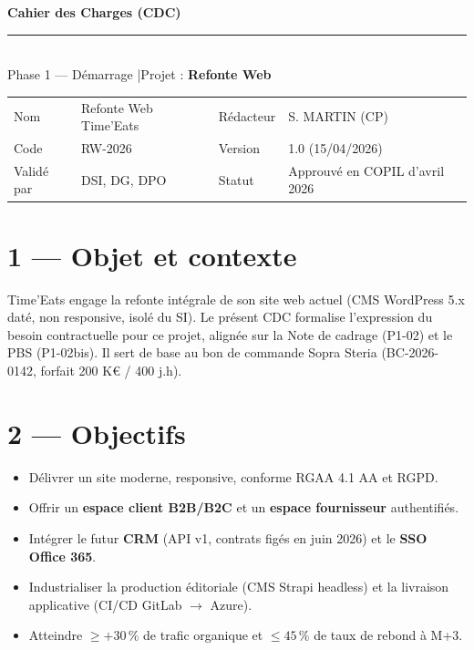 \documentclass[11pt,a4paper,oneside]{report}
\begin{document}
\small

\begin{center}
{\LARGE\bfseries\color{cnNavy} Cahier des Charges (CDC)}\\[4pt]
\textcolor{cnOrange}{\rule{10cm}{1pt}}\\[4pt]
{\large\color{cnSlate} Phase 1 --- Démarrage \quad|\quad Projet : \textbf{Refonte Web}}
\end{center}

\vspace{6pt}
\renewcommand{\arraystretch}{1.4}
\begin{tabularx}{\textwidth}{L{3.5cm} Y L{3.5cm} Y}
\toprule
{} & \th{} &  & \th{} \\
\midrule
Nom        & Refonte Web Time'Eats & Rédacteur & S. MARTIN (CP) \\
Code       & RW-2026              & Version   & 1.0 (15/04/2026) \\
Validé par & DSI, DG, DPO          & Statut    & Approuvé en COPIL d'avril 2026 \\
\bottomrule
\end{tabularx}

\section*{1 --- Objet et contexte}

Time'Eats engage la refonte intégrale de son site web actuel (CMS WordPress 5.x daté, non responsive, isolé du SI). Le présent CDC formalise l'expression du besoin contractuelle pour ce projet, alignée sur la Note de cadrage (P1-02) et le PBS (P1-02bis). Il sert de base au bon de commande Sopra Steria (BC-2026-0142, forfait 200 K€ / 400 j.h).

\section*{2 --- Objectifs}

\begin{itemize}
  \item Délivrer un site moderne, responsive, conforme RGAA 4.1 AA et RGPD.
  \item Offrir un \textbf{espace client B2B/B2C} et un \textbf{espace fournisseur} authentifiés.
  \item Intégrer le futur \textbf{CRM} (API v1, contrats figés en juin 2026) et le \textbf{SSO Office 365}.
  \item Industrialiser la production éditoriale (CMS Strapi headless) et la livraison applicative (CI/CD GitLab $\to$ Azure).
  \item Atteindre $\geq +30\,\%$ de trafic organique et $\leq 45\,\%$ de taux de rebond à M+3.
\end{itemize}
\end{document}

